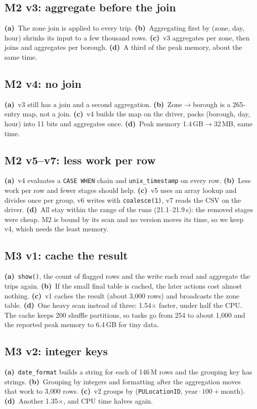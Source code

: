 \documentclass[sigconf]{acmart}
\newcommand{\pa}{\textbf{(a)}~}\newcommand{\pb}{\textbf{(b)}~}\newcommand{\pc}{\textbf{(c)}~}\newcommand{\pd}{\textbf{(d)}~}
\begin{document}
\subsection{M2 v3: aggregate before the join}
\pa The zone join is applied to every trip. \pb Aggregating first by (zone, day, hour) shrinks its input to a few thousand rows.
\pc v3 aggregates per zone, then joins and aggregates per borough. \pd A third of the peak memory, about the same time.

\subsection{M2 v4: no join}
\pa v3 still has a join and a second aggregation. \pb Zone$\rightarrow$borough is a 265-entry map, not a join. \pc v4 builds the
map on the driver, packs (borough, day, hour) into 11 bits and aggregates once. \pd Peak memory 1.4\,GB$\rightarrow$32\,MB, same time.

\subsection{M2 v5--v7: less work per row}
\pa v4 evaluates a \texttt{CASE WHEN} chain and \texttt{unix\_timestamp} on every row. \pb Less work per row and fewer stages should
help. \pc v5 uses an array lookup and divides once per group, v6 writes with \texttt{coalesce(1)}, v7 reads the CSV on the driver.
\pd All stay within the range of the runs (21.1--21.9\,s): the removed stages were cheap. M2 is bound by its scan and no version moves its time, so we keep v4, which needs the least memory.

\subsection{M3 v1: cache the result}
\pa \texttt{show()}, the count of flagged rows and the write each read and aggregate the trips again. \pb If the small final table
is cached, the later actions cost almost nothing. \pc v1 caches the result (about 3{,}000 rows) and broadcasts the zone table.
\pd One heavy scan instead of three: 1.54$\times$ faster, under half the CPU. The cache keeps 200 shuffle partitions, so tasks go
from 254 to about 1{,}000 and the reported peak memory to 6.4\,GB for tiny data.

\subsection{M3 v2: integer keys}
\pa \texttt{date\_format} builds a string for each of 146\,M rows and the grouping key has strings. \pb Grouping by integers and
formatting after the aggregation moves that work to 3{,}000 rows. \pc v2 groups by (\texttt{PULocationID},
$\text{year}\cdot100+\text{month}$). \pd Another 1.35$\times$, and CPU time halves again.
\end{document}

